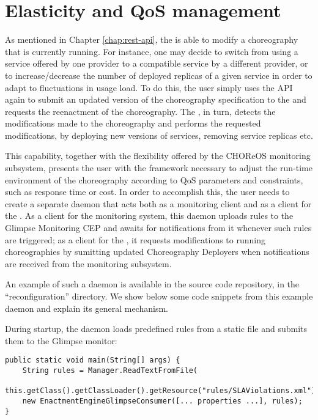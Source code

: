 \chapter{Elasticity and QoS management}

As mentioned in Chapter \ref{chap:rest-api}, the \ee is able to modify a
choreography that is currently running.
%
For instance, one may decide to switch from using a service offered by one
provider to a compatible service by a different provider, or to
increase/decrease the number of deployed replicas of a given service in order
to adapt to fluctuations in usage load.
%
To do this, the user simply uses the API again to submit an updated version of the
choreography specification to the \ee and requests the reenactment of the
choreography.
%
The \ee, in turn, detects the modifications made to the choreography and
performs the requested modifications, by deploying new versions of services,
removing service replicas etc.

This capability, together with the flexibility offered by the CHOReOS
monitoring subsystem, presents the user with the framework necessary to adjust
the run-time environment of the choreography according to QoS parameters and
constraints, such as response time or cost.
%
In order to accomplish this, the user needs to create a separate daemon that
acts both as a monitoring client and as a client for the \ee.
%
As a client for the monitoring system, this daemon uploads rules to the
Glimpse Monitoring CEP and awaits for notifications from it whenever such
rules are triggered;
%
as a client for the \ee, it requests modifications to running choreographies
by sumitting updated Choreography Deployers when notifications are received
from the monitoring subsystem.

An example of such a daemon is available in the \ee source code repository,
in the ``reconfiguration'' directory. We show below some code snippets from
this example daemon and explain its general mechanism.

During startup, the daemon loads predefined rules from a static file and
submits them to the Glimpse monitor:

\begin{verbatim}
public static void main(String[] args) {
    String rules = Manager.ReadTextFromFile(
        this.getClass().getClassLoader().getResource("rules/SLAViolations.xml").getFile());
    new EnactmentEngineGlimpseConsumer([... properties ...], rules);
}
\end{verbatim}

